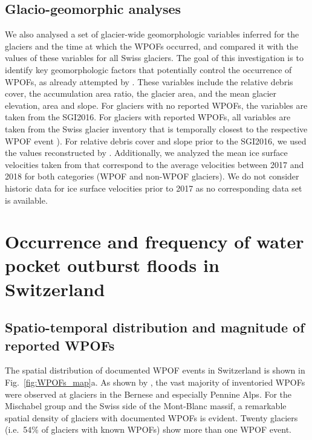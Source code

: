\subsection{ Glacio-geomorphic analyses}
\label{method_geo}

We also analysed a set of glacier-wide geomorphologic variables inferred for the glaciers and the time at which the WPOFs occurred, and compared it with the values of these variables for all Swiss glaciers. The goal of this investigation is to identify key geomorphologic factors that potentially control the occurrence of WPOFs, as already attempted by \cite{Haeberli1983}. These variables include the relative debris cover, the accumulation area ratio, the glacier area, and the mean glacier elevation, area and slope. For glaciers with no reported WPOFs, the variables are taken from the SGI2016. For glaciers with reported WPOFs, all variables are taken from the Swiss glacier inventory that is temporally closest to the respective WPOF event \citep[SGI1850, SGI1973 and SGI2016;][]{Muller&al1976,Maisch&al2000,Linsbauer&al2021}). For relative debris cover and slope prior to the SGI2016, we used the values reconstructed by \cite{Altrock2022}. Additionally, we analyzed the mean ice surface velocities taken from \cite{Millan&al2022} that correspond to the average velocities between 2017 and 2018 for both categories (WPOF and non-WPOF glaciers). We do not consider historic data for ice surface velocities prior to 2017 as no corresponding data set is available.


\section{ Occurrence and frequency of water pocket outburst floods in Switzerland}
\label{sec:inventary}

\subsection{ Spatio-temporal distribution and magnitude of reported WPOFs}
\label{Sec:Spatio_temporal}

The spatial distribution of documented WPOF events in Switzerland is shown in Fig.~\ref{fig:WPOFs_map}a. As shown by \citet{Haeberli1983}, the vast majority of inventoried WPOFs were observed at glaciers in the Bernese and especially Pennine Alps. For the Mischabel group and the Swiss side of the Mont-Blanc massif, a remarkable spatial density of glaciers with documented WPOFs is evident. Twenty glaciers (i.e.\ 54\% of glaciers with known WPOFs) show more than one WPOF event. 

